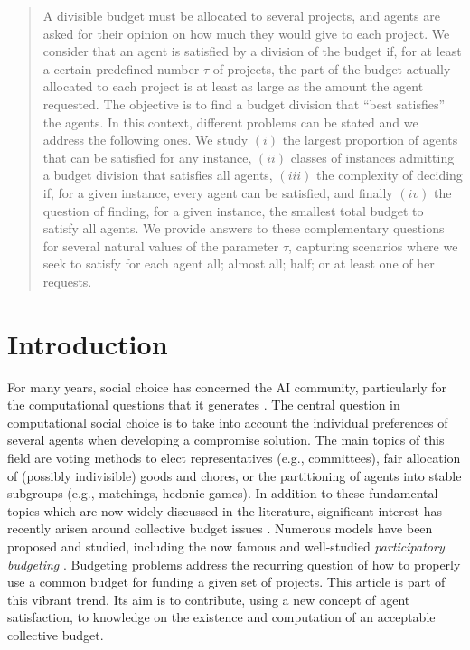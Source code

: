 \documentclass{article}
\begin{document}
\begin{abstract}
A divisible budget must be allocated to several projects, and agents are asked for their opinion on how much they would give to each project. 
We consider that an agent is satisfied by a  division of the budget if, for at least a certain predefined number $\tau$ of projects, the part of the budget actually allocated to each project is at 
least as large as the amount the agent requested. 
The objective is to find  
a budget division that ``best satisfies'' the agents.  
In this context, different problems can be stated and we  
address the following ones. We study  $(i)$ the largest proportion of agents that can be satisfied for any instance, $(ii)$  classes of instances admitting a budget division that satisfies all agents, $(iii)$ the complexity of deciding if, for a given instance, every agent can be satisfied, and finally $(iv)$ the question of finding, for a given instance, the smallest total budget 
to satisfy all agents.  
We provide answers to these complementary questions for several natural  
values of the parameter $\tau$, capturing scenarios where we seek to satisfy for each agent all; almost all; half; or at least one of her requests.

\end{abstract}






\section{Introduction}

For many years, social choice has concerned the AI community, particularly for the computational questions that it generates \cite{BCELP2016,UE17,JR2024}. The central question in computational social choice is to take into account the individual preferences of several agents when developing a compromise solution. The main topics of this field are voting methods to elect representatives (e.g., committees), fair allocation of (possibly indivisible) goods and chores, or the partitioning of agents into stable subgroups (e.g., matchings, hedonic games). In addition to these fundamental topics which are now widely discussed in the literature, significant interest has recently arisen around collective budget issues \cite{BogomolnaiaMS05,ABM20,AS21,MPS20,AACKLP23,BGPSW24,FPPV21,CGL21,CGL22,WagnerM23,BRANDL2022102585,EST23,GoyalSSG23,CCP24,FS24}. Numerous models have been proposed and studied, including the now famous and well-studied \emph{participatory budgeting} \cite{Cabannes2004,de2022international}. Budgeting problems 
address the recurring question of how to properly use a common budget for funding a given set of projects. This article is part of this vibrant trend. Its aim is to contribute, using a new concept of agent satisfaction, to knowledge on the existence and computation of an acceptable collective budget.
\end{document}

